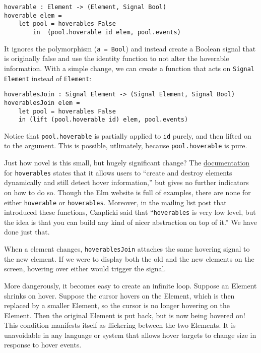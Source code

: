 \documentclass{article}
\begin{document}
\begin{verbatim}
hoverable : Element -> (Element, Signal Bool)
hoverable elem =
    let pool = hoverables False
        in  (pool.hoverable id elem, pool.events)
\end{verbatim}

It ignores the polymorphism (\texttt{a = Bool}) and instead create a
Boolean signal that is originally false and use the identity function to
not alter the hoverable information. With a simple change, we can create
a function that acts on \texttt{Signal Element} instead of
\texttt{Element}:

\begin{verbatim}
hoverablesJoin : Signal Element -> (Signal Element, Signal Bool)
hoverablesJoin elem =
    let pool = hoverables False
    in (lift (pool.hoverable id) elem, pool.events)
\end{verbatim}

Notice that \texttt{pool.hoverable} is partially applied to \texttt{id}
purely, and then lifted on to the argument. This is possible,
utlimately, because \texttt{pool.hoverable} is pure.

Just how novel is this small, but hugely significant change? The
\href{http://docs.elm-lang.org/library/Graphics/Input.elm\#hoverables}{documentation}
for \texttt{hoverables} states that it allows users to ``create and
destroy elements dynamically and still detect hover information,'' but
gives no further indicators on how to do so. Though the Elm website is
full of examples, there are none for either \texttt{hoverable} or
\texttt{hoverables}. Moreover, in the
\href{https://groups.google.com/d/msg/elm-discuss/QgowLy5jdhA/CZQfjkbjMsEJ}{mailing
list post} that introduced these functions, Czaplicki said that
``\texttt{hoverables} is very low level, but the idea is that you can
build any kind of nicer abstraction on top of it.'' We have done just
that.

When a element changes, \texttt{hoverablesJoin} attaches the same
hovering signal to the new element. If we were to display both the old
and the new elements on the screen, hovering over either would trigger
the signal.

More dangerously, it becomes easy to create an infinite loop. Suppose an
Element shrinks on hover. Suppose the cursor hovers on the Element,
which is then replaced by a smaller Element, so the cursor is no longer
hovering on the Element. Then the original Element is put back, but is
now being hovered on! This condition manifests itself as flickering
between the two Elements. It is unavoidable in any language or system
that allows hover targets to change size in response to hover events.
\end{document}
